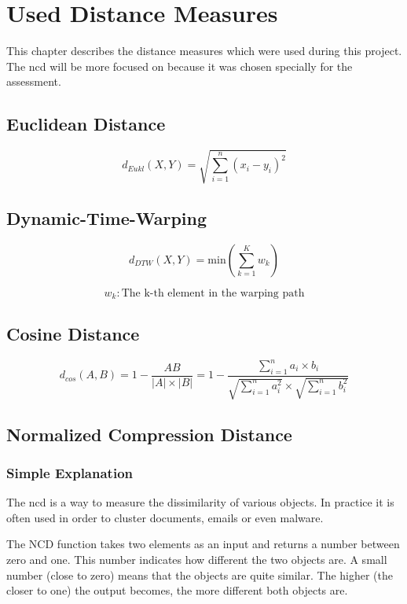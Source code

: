 \chapter{Used Distance Measures}

This chapter describes the distance measures which were used during this project. The \ac{ncd} will be more focused on because it was chosen specially for the assessment.

\section{Euclidean Distance}

$$ d_{Eukl}(X,Y) = \sqrt{\sum_{i=1}^{n} (x_{i} - y_{i})^{2} } $$

\section{Dynamic-Time-Warping}



$$ d_{DTW}(X,Y) = \text{min}\left( \sum_{k=1}^{K}w_{k} \right) $$

$$ w_{k} : \text{The k-th element in the warping path} $$

\section{Cosine Distance}



$$ d_{cos}(A,B) = 1 - \frac{AB}{|A|\times|B|} 
                  = 1 - \frac{\sum_{i=1}^{n} a_{i}\times b_{i}}
                  { \sqrt{ \sum_{i=1}^{n} a_{i}^{2} } \times \sqrt{ \sum_{i=1}^{n} b_{i}^{2} } } $$


\clearpage
\section{Normalized Compression Distance}
\subsection{Simple Explanation}

The \ac{ncd} is a way to measure the dissimilarity of various objects. In practice it is often used in order to cluster documents, emails or even malware.


The NCD function takes two elements as an input and returns a number between zero and one. This number indicates how different the two objects are. A small number (close to zero) means that the objects are quite similar. The higher (the closer to one) the output becomes, the more different both objects are.


